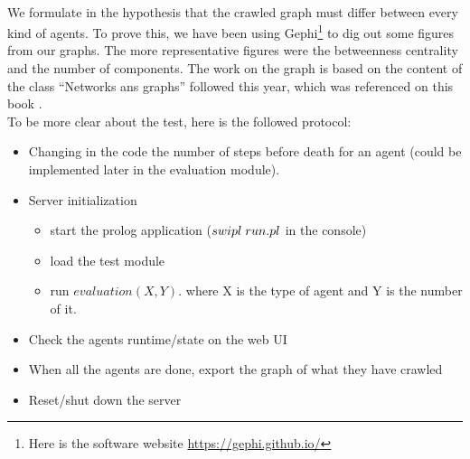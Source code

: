 \documentclass{article}
\newenvironment{itemh}[0]{\begin{itemize}[font=\color{mygray} \small]}{\end{itemize}}
\newenvironment{itemH}[0]{\begin{itemize}[font=\color{mygray} \large]}{\end{itemize}}
\begin{document}
		\paragraph{}
			We formulate in the hypothesis that the crawled graph must differ between every kind of agents.
			To prove this, we have been using Gephi\footnote{
				Here is the software website \url{https://gephi.github.io/}
			} to dig out some figures from our graphs.
			The more representative figures were the betweenness centrality and the number of components.
			The work on the graph is based on the content of the class ``Networks ans graphs'' followed this year,
			which was referenced on this book \cite{Steen10}.\\
		\newline
			To be more clear about the test, here is the followed protocol:
			\begin{itemH}
				\item Changing in the code the number of steps before death for an agent
				(could be implemented later in the evaluation module).
				\item Server initialization
				\begin{itemh}
					\item start the prolog application ($swipl\hspace{1mm} run.pl$ in the console)
					\item load the test module
					\item run $evaluation(X,Y).$ where X is the type of agent and Y is the number of it.
				\end{itemh}
				\item Check the agents runtime/state on the web UI
				\item When all the agents are done, export the graph of what they have crawled
				\item Reset/shut down the server
			\end{itemH}
\end{document}

